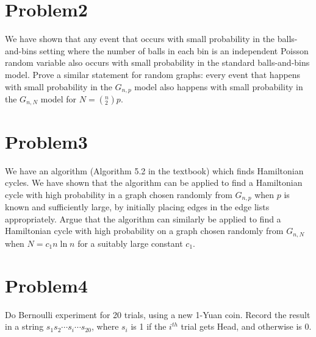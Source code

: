 \documentclass[12pt]{article}
\begin{document}
\section{Problem2}
We have shown that any event that occurs with small probability in the balls-and-bins setting where the number of balls in each bin is an independent Poisson random variable also occurs with small probability in the standard balls-and-bins model. Prove a similar statement for random graphs: every event that happens with small probability in the $G_{n,p}$ model also happens with small probability in the $G_{n,N}$ model for $N = ({}^n_2)p$.

\section{Problem3}
We have an algorithm (Algorithm 5.2 in the textbook) which finds Hamiltonian cycles. We have shown that the algorithm can be applied to find a Hamiltonian cycle with high probability in a graph chosen randomly from $G_{n,p}$ when $p$ is known and sufficiently large, by initially placing edges in the edge lists appropriately. Argue that the algorithm can similarly be applied to find a Hamiltonian cycle with high probability on a graph chosen randomly from $G_{n,N}$ when $N = c_1n \ln n$ for a suitably large constant $c_1$.

\section{Problem4}
Do Bernoulli experiment for 20 trials, using a new 1-Yuan coin. Record the result in a
string $s_1s_2 \cdots s_i \cdots s_{20}$, where $s_i$ is 1 if the $i^{th}$ trial gets Head, and otherwise is 0.
\end{document}
